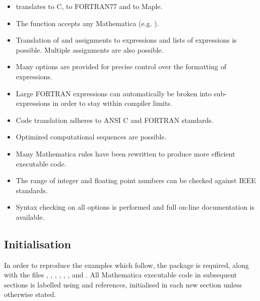 \documentclass [12pt,twoside]{article}
\begin{document}
\begin{itemize}
\item {} translates to C,  to FORTRAN77 and
 to Maple.

\item The  function accepts any Mathematica 
(e.g. ).

\item Translation of and assignments to expressions and lists of
expressions is possible. Multiple assignments are also possible.

\item Many options are provided for precise control over the formatting
of expressions.

\item Large FORTRAN expressions can automatically be broken into
sub-expressions in order to stay within compiler limits.

\item Code translation adheres to ANSI C and FORTRAN standards.

\item Optimized computational sequences are possible.

\item Many Mathematica rules have been rewritten to produce more
efficient executable code.

\item The range of integer and floating point numbers can be checked
against IEEE standards.

\item Syntax checking on all options is performed and full on-line
documentation is available.
\end{itemize}

\pagebreak[2]

\subsection{Initialisation}
In order to reproduce the examples which follow, the package  is required,
along with the files , , ,
, , , and . All
Mathematica executable code in subsequent sections is labelled using  and
 references, initialised in each new section unless otherwise stated.

\pagebreak[2]
\end{document}
